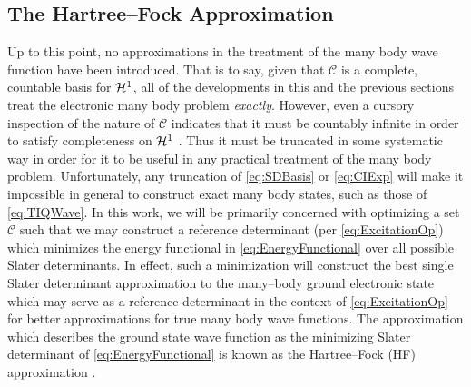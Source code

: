 \subsection{The Hartree--Fock Approximation}
\label{sec:HF}
Up to this point, no approximations in the treatment of the many body wave function have been introduced. That is
to say, given that $\mathcal{C}$ is a complete, countable basis for $\mathcal{H}^1$, all of the developments
in this and the previous sections treat the electronic many body problem \emph{exactly}. However, even a cursory
inspection of the nature of $\mathcal{C}$ indicates that it must be countably infinite in order to 
satisfy completeness on $\mathcal{H}^1$ . Thus it must be truncated in some systematic
way in order for it to be useful in any practical treatment of the many body problem.
Unfortunately, any truncation of \cref{eq:SDBasis} or \cref{eq:CIExp} will make it impossible in general to
construct exact many body states, such as those of \cref{eq:TIQWave}.
In this work, we will be primarily concerned with optimizing a set $\mathcal{C}$ such that
we may construct a reference determinant (per \cref{eq:ExcitationOp}) which minimizes the energy functional
in \cref{eq:EnergyFunctional} over all possible Slater determinants. In effect, such a minimization will
construct the best single Slater determinant approximation to the many--body ground electronic state
which may serve as a reference determinant in the context of \cref{eq:ExcitationOp} for better approximations
for  true many body wave functions. The approximation which describes the ground state wave function as the 
minimizing Slater determinant of \cref{eq:EnergyFunctional} is known as the Hartree--Fock (HF) approximation .

